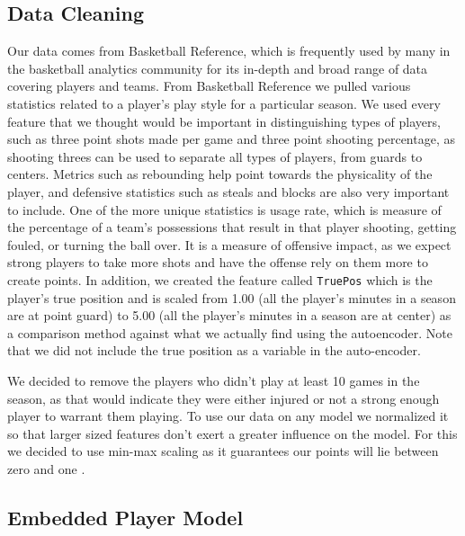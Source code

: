 \documentclass[12pt, letterpaper, titlepage]{article}
\begin{document}
\subsection{Data Cleaning}
Our data comes from Basketball Reference, which is frequently used by many in the basketball analytics community for its in-depth and broad range of data covering players and teams.  From Basketball Reference we pulled various statistics related to a player’s play style for a particular season.  We used every feature that we thought would be important in distinguishing types of players, such as three point shots made per game and three point shooting percentage, as shooting threes can be used to separate all types of players, from guards to centers. Metrics such as rebounding help point towards the physicality of the player, and defensive statistics such as steals and blocks are also very important to include.  One of the more unique statistics is usage rate, which is measure of the percentage of a team’s possessions that result in that player shooting, getting fouled, or turning the ball over.  It is a measure of offensive impact, as we expect strong players to take more shots and have the offense rely on them more to create points.  In addition, we created the feature called \texttt{TruePos} which is the player’s true position and is scaled from 1.00 (all the player’s minutes in a season are at point guard) to 5.00 (all the player’s minutes in a season are at center) as a comparison method against what we actually find using the autoencoder. Note that we did not include the true position as a variable in the auto-encoder.

We decided to remove the players who didn’t play at least 10 games in the season, as that would indicate they were either injured or not a strong enough player to warrant them playing. To use our data on any model we normalized it so that larger sized features don’t exert a greater influence on the model.  For this we decided to use min-max scaling as it guarantees our points will lie between zero and one \citep{scikit-learn}.

\subsection{Embedded Player Model}
\end{document}
